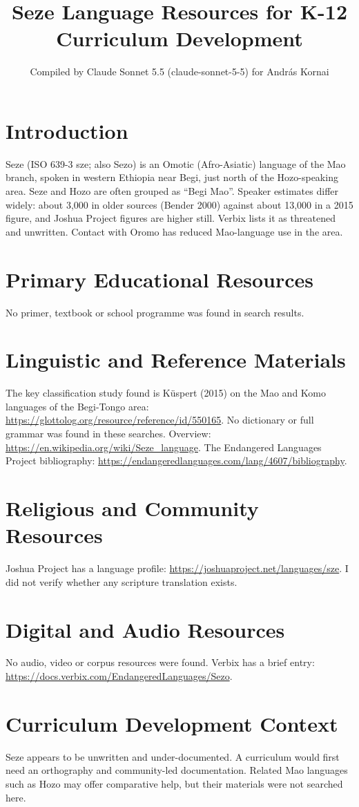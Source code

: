 \documentclass[12pt]{article}
\title{Seze Language Resources for K-12 Curriculum Development}
\author{Compiled by Claude Sonnet 5.5 (claude-sonnet-5-5) for Andr\'as Kornai}
\date{}
\begin{document}
\maketitle

\section{Introduction}
Seze (ISO 639-3 sze; also Sezo) is an Omotic (Afro-Asiatic) language of the Mao branch, spoken in western Ethiopia near Begi, just north of the Hozo-speaking area. Seze and Hozo are often grouped as ``Begi Mao''. Speaker estimates differ widely: about 3,000 in older sources (Bender 2000) against about 13,000 in a 2015 figure, and Joshua Project figures are higher still. Verbix lists it as threatened and unwritten. Contact with Oromo has reduced Mao-language use in the area.

\section{Primary Educational Resources}
No primer, textbook or school programme was found in search results.

\section{Linguistic and Reference Materials}
The key classification study found is Küspert (2015) on the Mao and Komo languages of the Begi-Tongo area: \url{https://glottolog.org/resource/reference/id/550165}. No dictionary or full grammar was found in these searches. Overview: \url{https://en.wikipedia.org/wiki/Seze_language}. The Endangered Languages Project bibliography: \url{https://endangeredlanguages.com/lang/4607/bibliography}.

\section{Religious and Community Resources}
Joshua Project has a language profile: \url{https://joshuaproject.net/languages/sze}. I did not verify whether any scripture translation exists.

\section{Digital and Audio Resources}
No audio, video or corpus resources were found. Verbix has a brief entry: \url{https://docs.verbix.com/EndangeredLanguages/Sezo}.

\section{Curriculum Development Context}
Seze appears to be unwritten and under-documented. A curriculum would first need an orthography and community-led documentation. Related Mao languages such as Hozo may offer comparative help, but their materials were not searched here.
\end{document}
